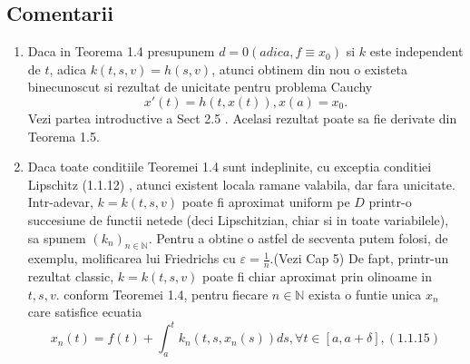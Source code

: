 \documentclass[a4paper,12pt,oneside]{report}
\begin{document}
\subsection{Comentarii}

\begin{enumerate}[1.]
\item Daca in Teorema 1.4 presupunem \(d = 0 ( adica, f \equiv x_{0} )\) si \(k\) este independent de \(t\), adica \(k\left ( t,s,v \right ) = h \left ( s,v \right )\), atunci obtinem din nou o existeta binecunoscut si rezultat de unicitate pentru problema Cauchy 
\begin{displaymath}
  {x}'\left ( t \right ) = h\left ( t,x\left ( t \right ) \right ), x\left ( a \right ) = x_{0}.
\end{displaymath}
Vezi partea introductive a Sect 2.5 . Acelasi rezultat poate sa fie derivate din Teorema 1.5. 
\item Daca toate conditiile Teoremei 1.4 sunt indeplinite, cu exceptia conditiei Lipschitz (1.1.12) , atunci existent locala ramane valabila, dar fara unicitate. Intr-adevar, \(k = k\left ( t,s,v \right )\) poate fi aproximat uniform pe \(D\) printr-o succesiune de functii netede (deci Lipschitzian, chiar si in toate variabilele), sa spunem \(\left ( k_{n} \right )_{n\in \mathbb{N}}\). Pentru a obtine o astfel de secventa putem folosi, de exemplu, molificarea lui Friedrichs cu \(\varepsilon = \frac{1}{n}\).(Vezi Cap 5)  De fapt, printr-un rezultat classic, \(k = k\left ( t,s,v \right )\) poate fi chiar aproximat prin olinoame in \(t,s,v\). conform Teoremei 1.4, pentru fiecare \(n \in \mathbb{N}\) exista o funtie unica \(x_{n}\) care satisfice ecuatia
\begin{displaymath}
  x_{n}\left ( t \right ) = f\left ( t \right ) + \int_{a}^{t}k_{n}\left ( t,s,x_{n}\left ( s \right ) \right )ds, \forall t\in \left [ a,a+\delta  \right ], (1.1.15)
\end{displaymath}


\end{enumerate}
\end{document}
